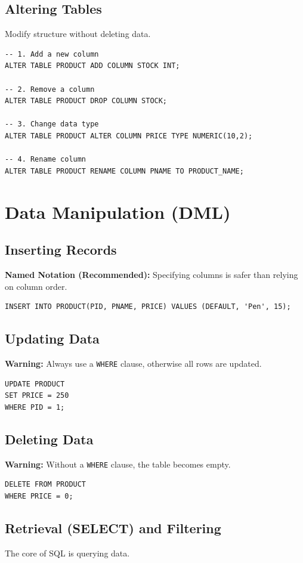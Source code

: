 \documentclass[12pt,a4paper]{article}
\begin{document}
\subsection{Altering Tables}
Modify structure without deleting data.

\begin{lstlisting}
-- 1. Add a new column
ALTER TABLE PRODUCT ADD COLUMN STOCK INT;

-- 2. Remove a column
ALTER TABLE PRODUCT DROP COLUMN STOCK;

-- 3. Change data type
ALTER TABLE PRODUCT ALTER COLUMN PRICE TYPE NUMERIC(10,2);

-- 4. Rename column
ALTER TABLE PRODUCT RENAME COLUMN PNAME TO PRODUCT_NAME;
\end{lstlisting}

\section{Data Manipulation (DML)}

\subsection{Inserting Records}
\textbf{Named Notation (Recommended):}
Specifying columns is safer than relying on column order.
\begin{lstlisting}
INSERT INTO PRODUCT(PID, PNAME, PRICE) VALUES (DEFAULT, 'Pen', 15);
\end{lstlisting}

\subsection{Updating Data}
\textbf{Warning:} Always use a \texttt{WHERE} clause, otherwise all rows are updated.
\begin{lstlisting}
UPDATE PRODUCT
SET PRICE = 250
WHERE PID = 1;
\end{lstlisting}

\subsection{Deleting Data}
\textbf{Warning:} Without a \texttt{WHERE} clause, the table becomes empty.
\begin{lstlisting}
DELETE FROM PRODUCT
WHERE PRICE = 0;
\end{lstlisting}

\subsection{Retrieval (SELECT) and Filtering}
The core of SQL is querying data.
\end{document}
